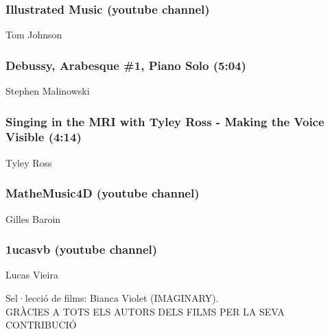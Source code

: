 \subsubsection*{Illustrated Music (youtube channel)}
Tom Johnson

\subsubsection*{Debussy, Arabesque \#1, Piano Solo (5:04)}
Stephen Malinowski

\subsubsection*{Singing in the MRI with Tyley Ross - Making the Voice Visible (4:14)}
Tyley Ross

\subsubsection*{MatheMusic4D (youtube channel)}
Gilles Baroin

\subsubsection*{1ucasvb (youtube channel)}
Lucas Vieira

\vfill

Sel·lecció de films: Bianca Violet (IMAGINARY).\\
GRÀCIES A TOTS ELS AUTORS DELS FILMS PER LA SEVA CONTRIBUCIÓ


